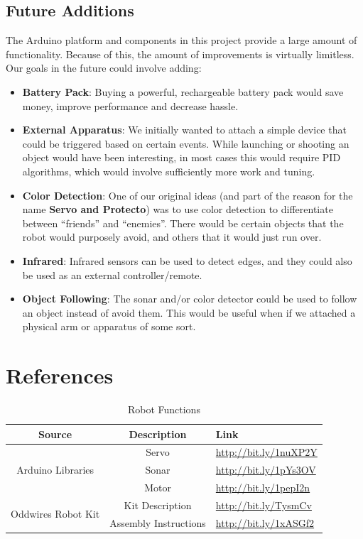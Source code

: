 \documentclass[11pt]{article}
\begin{document}
\subsection{Future Additions}
The Arduino platform and components in this project provide a large amount of functionality.  Because of this, the amount of improvements is virtually limitless.  Our goals in the future could involve adding:
		\begin{itemize}				
		\item \textbf{Battery Pack}: Buying a powerful, rechargeable battery pack would save money, improve performance and decrease hassle.
		\item \textbf{External Apparatus}: We initially wanted to attach a simple device that could be triggered based on certain events.  While launching or shooting an object would have been interesting, in most cases this would require PID algorithms, which would involve sufficiently more work and tuning.
		\item \textbf{Color Detection}: One of our original ideas (and part of the reason for the name \textbf{Servo and Protecto}) was to use color detection to differentiate between ``friends'' and ``enemies''.  There would be certain objects that the robot would purposely avoid, and others that it would just run over.
		\item \textbf{Infrared}: Infrared sensors can be used to detect edges, and they could also be used as an external controller/remote.
		\item \textbf{Object Following}: The sonar and/or color detector could be used to follow an object instead of avoid them.  This would be useful when if we attached a physical arm or apparatus of some sort.
		\end{itemize}

\section{References}

	\begin {table}[h!]
	\begin {center} 
	\vspace{15pt}
	
	\begin{tabular}{||c|c|l||}\hline	
		\textbf{Source}	&	\textbf{Description}	&	\textbf{Link}		\\\hline
		\multirow{3}{*}{Arduino Libraries}
						&	Servo		&	\url{http://bit.ly/1nuXP2Y} 		\\
						&	Sonar		&	\url{http://bit.ly/1pYs3OV} 		\\
						&	Motor		&	\url{http://bit.ly/1pepI2n}	 	\\\hline
		\multirow{2}{*}{Oddwires Robot Kit}
						&	Kit Description		&	 \url{http://bit.ly/TysmCv} \\
					&	Assembly Instructions		&	\url{http://bit.ly/1xASGf2} \\\hline

	\end{tabular}
		\caption {Robot Functions} \label{refs}
	\end{center}
	\end{table} 	
\end{document}
